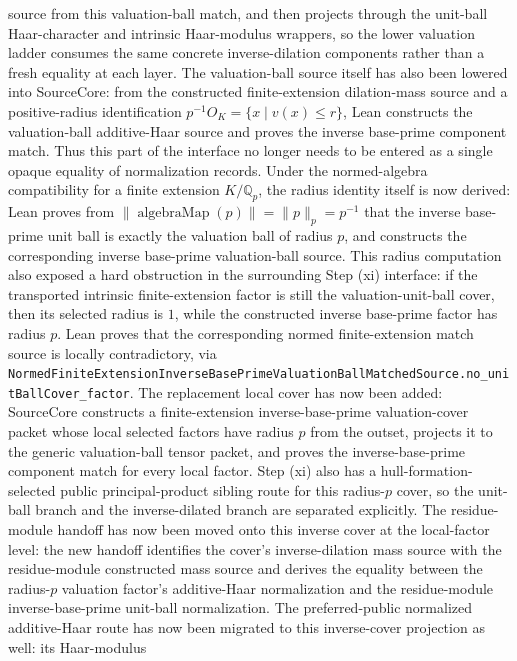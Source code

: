 \documentclass[11pt]{article}
\theoremstyle{plain}
\theoremstyle{definition}
\theoremstyle{remark}
\begin{document}
  source from this valuation-ball match, and then projects through the unit-ball
  Haar-character and intrinsic Haar-modulus wrappers, so the lower valuation
  ladder consumes the same concrete inverse-dilation components rather than a
  fresh equality at each layer.  The valuation-ball source itself has also been
  lowered into SourceCore: from the constructed finite-extension dilation-mass
  source and a positive-radius identification
  \(p^{-1}O_K=\{x\mid v(x)\le r\}\), Lean constructs the valuation-ball
  additive-Haar source and proves the inverse base-prime component match.  Thus
  this part of the interface no longer needs to be entered as a single opaque
  equality of normalization records.  Under the normed-algebra compatibility
  for a finite extension \(K/\mathbb Q_p\), the radius identity itself is now
  derived: Lean proves from
  \(\lVert\operatorname{algebraMap}(p)\rVert=\lVert p\rVert_p=p^{-1}\) that
  the inverse base-prime unit ball is exactly the valuation ball of radius
  \(p\), and constructs the corresponding inverse base-prime valuation-ball
  source.  This radius computation also exposed a hard obstruction in the
  surrounding Step (xi) interface: if the transported intrinsic
  finite-extension factor is still the valuation-unit-ball cover, then its
  selected radius is \(1\), while the constructed inverse base-prime factor has
  radius \(p\).  Lean proves that the corresponding normed finite-extension
  match source is locally contradictory, via
  \texttt{NormedFiniteExtensionInverseBasePrimeValuationBallMatchedSource.no\_unitBallCover\_factor}.
  The replacement local cover has now been added: SourceCore constructs a
  finite-extension inverse-base-prime valuation-cover packet whose local
  selected factors have radius \(p\) from the outset, projects it to the generic
  valuation-ball tensor packet, and proves the inverse-base-prime component
  match for every local factor.  Step (xi) also has a hull-formation-selected
  public principal-product sibling route for this radius-\(p\) cover, so the
  unit-ball branch and the inverse-dilated branch are separated explicitly.
  The residue-module handoff has now been moved onto this inverse cover at the
  local-factor level: the new handoff identifies the cover's inverse-dilation
  mass source with the residue-module constructed mass source and derives the
  equality between the radius-\(p\) valuation factor's additive-Haar
  normalization and the residue-module inverse-base-prime unit-ball
  normalization.  The preferred-public normalized additive-Haar route has now
  been migrated to this inverse-cover projection as well: its Haar-modulus
\end{document}

